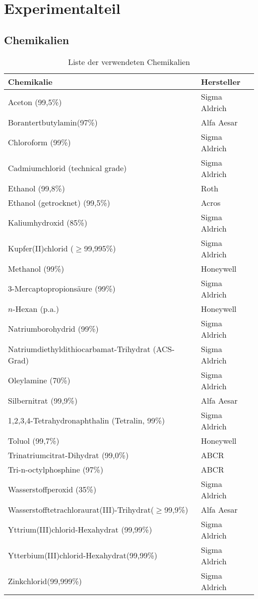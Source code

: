 \section{Experimentalteil}
	\subsection{Chemikalien}
		\begin{table}[H]
			\centering
			\caption{Liste der verwendeten Chemikalien}
			\label{tab:Chemikalien}
			\begin{tabular}{ll}
				\toprule
				Chemikalie & Hersteller \\
				\midrule
				Aceton (99,5\%)&Sigma Aldrich\\
				Borantertbutylamin(97\%) &Alfa Aesar\\
				Chloroform (99\%)&Sigma Aldrich\\
				Cadmiumchlorid (technical grade)&Sigma Aldrich\\
				Ethanol (99,8\%)&Roth\\	
				Ethanol (getrocknet) (99,5\%)&Acros\\
				Kaliumhydroxid (85\%)&Sigma Aldrich\\
				Kupfer(II)chlorid ($\geq$99,995\%)&Sigma Aldrich\\
				Methanol (99\%)&Honeywell\\
				3-Mercaptopropionsäure (99\%)&Sigma Aldrich\\
				$n$-Hexan (p.a.)&Honeywell\\
				Natriumborohydrid (99\%)&Sigma Aldrich\\
				Natriumdiethyldithiocarbamat-Trihydrat (ACS-Grad)& Sigma Aldrich\\
				Oleylamine (70\%)&Sigma Aldrich\\
				Silbernitrat (99,9\%)&Alfa Aesar\\
				1,2,3,4-Tetrahydronaphthalin (Tetralin, 99\%)&Sigma Aldrich\\
				Toluol (99,7\%) &Honeywell\\
				Trinatriumcitrat-Dihydrat (99,0\%)&ABCR\\
				Tri-n-octylphosphine  (97\%)& ABCR\\
				Wasserstoffperoxid (35\%)&Sigma Aldrich\\
				Wasserstofftetrachloraurat(III)-Trihydrat($\geq$99,9\%) & Alfa Aesar \\
				Yttrium(III)chlorid-Hexahydrat (99,99\%)&Sigma Aldrich\\
				Ytterbium(III)chlorid-Hexahydrat(99,99\%)&Sigma Aldrich\\
				Zinkchlorid(99,999\%)&Sigma Aldrich\\
				\bottomrule
			\end{tabular}
		\end{table}
	
